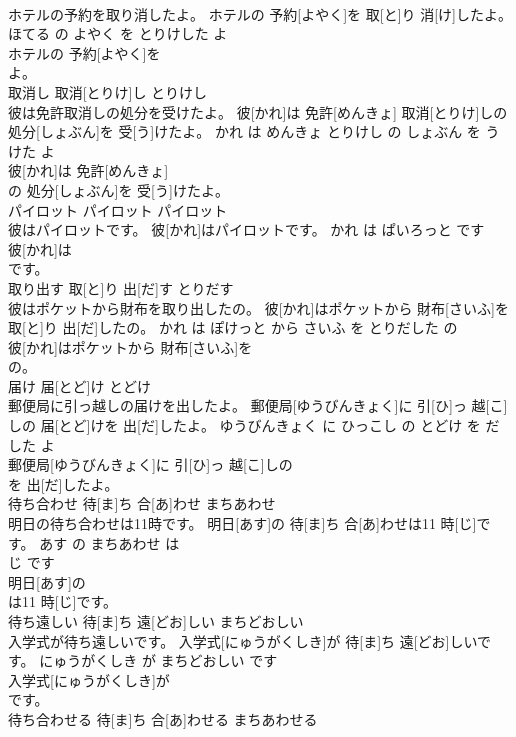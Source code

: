 \documentclass[8pt]{extreport}
\begin{document}
\begin{CJK}{UTF8}{min}
\\	ホテルの予約を取り消したよ。	ホテルの 予約[よやく]を 取[と]り 消[け]したよ。	ほてる の よやく を とりけした よ	
\\	ホテルの 予約[よやく]を
\\	よ。			
\\	取消し	取消[とりけ]し	とりけし	
\\	彼は免許取消しの処分を受けたよ。	彼[かれ]は 免許[めんきょ] 取消[とりけ]しの 処分[しょぶん]を 受[う]けたよ。	かれ は めんきょ とりけし の しょぶん を うけた よ	
\\	彼[かれ]は 免許[めんきょ]
\\	の 処分[しょぶん]を 受[う]けたよ。			
\\	パイロット	パイロット	パイロット	
\\	彼はパイロットです。	彼[かれ]はパイロットです。	かれ は ぱいろっと です	
\\	彼[かれ]は
\\	です。			
\\	取り出す	取[と]り 出[だ]す	とりだす	
\\	彼はポケットから財布を取り出したの。	彼[かれ]はポケットから 財布[さいふ]を 取[と]り 出[だ]したの。	かれ は ぽけっと から さいふ を とりだした の	
\\	彼[かれ]はポケットから 財布[さいふ]を
\\	の。			
\\	届け	届[とど]け	とどけ	
\\	郵便局に引っ越しの届けを出したよ。	郵便局[ゆうびんきょく]に 引[ひ]っ 越[こ]しの 届[とど]けを 出[だ]したよ。	ゆうびんきょく に ひっこし の とどけ を だした よ	
\\	郵便局[ゆうびんきょく]に 引[ひ]っ 越[こ]しの
\\	を 出[だ]したよ。			
\\	待ち合わせ	待[ま]ち 合[あ]わせ	まちあわせ	
\\	明日の待ち合わせは11時です。	明日[あす]の 待[ま]ち 合[あ]わせは11 時[じ]です。	あす の まちあわせ は 
\\	じ です	
\\	明日[あす]の
\\	は11 時[じ]です。			
\\	待ち遠しい	待[ま]ち 遠[どお]しい	まちどおしい	
\\	入学式が待ち遠しいです。	入学式[にゅうがくしき]が 待[ま]ち 遠[どお]しいです。	にゅうがくしき が まちどおしい です	
\\	入学式[にゅうがくしき]が
\\	です。			
\\	待ち合わせる	待[ま]ち 合[あ]わせる	まちあわせる	

\end{CJK}
\end{document}
